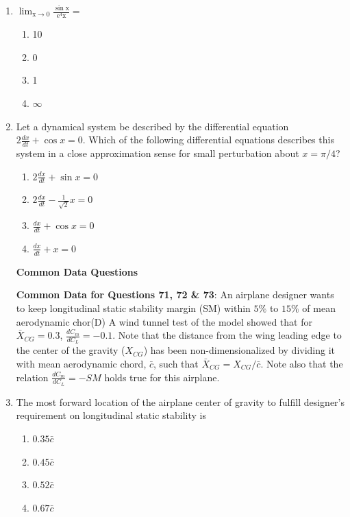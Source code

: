 \documentclass{article}
\begin{document}
\begin{enumerate}
    \item $\mathrm{\lim_{x \to 0} \frac{\sin x}{e^4 x} =}$
    \begin{multicols}{4}
    \begin{enumerate}
        \item 10
        \item 0
        \item 1
        \item $\infty$
    \end{enumerate}
    \end{multicols}
    

    \item Let a dynamical system be described by the differential equation $2 \frac{dx}{dt} + \cos x = 0$. Which of the following differential equations describes this system in a close approximation sense for small perturbation about $x = \pi/4$?
    \begin{multicols}{2}
    \begin{enumerate}
        \item $2 \frac{dx}{dt} + \sin x = 0$
        \item $2 \frac{dx}{dt} - \frac{1}{\sqrt{2}} x = 0$
        \item $\frac{dx}{dt} + \cos x = 0$
        \item $\frac{dx}{dt} + x = 0$
    \end{enumerate}
    \end{multicols}
    
\begin{center}
    \textbf{Common Data Questions}
\end{center}


\textbf{Common Data for Questions 71, 72 \& 73}: An airplane designer wants to keep longitudinal static stability margin (SM) within $5\%$ to $15\%$ of mean aerodynamic chor(D) A wind tunnel test of the model showed that for $\bar{X}_{CG} = 0.3$, $\frac{d C_m}{d C_L} = -0.1$. Note that the distance from the wing leading edge to the center of the gravity ($X_{CG}$) has been non-dimensionalized by dividing it with mean aerodynamic chord, $\bar{c}$, such that $\bar{X}_{CG} = X_{CG} / \bar{c}$. Note also that the relation $\frac{d C_m}{d C_L} = -SM$ holds true for this airplane.

    \item The most forward location of the airplane center of gravity to fulfill designer's requirement on longitudinal static stability is
    \begin{multicols}{4}
    \begin{enumerate}
        \item $0.35 \bar{c}$
        \item $0.45 \bar{c}$
        \item $0.52 \bar{c}$
        \item $0.67 \bar{c}$
    \end{enumerate}
    \end{multicols}
    


\end{enumerate}
\end{document}
